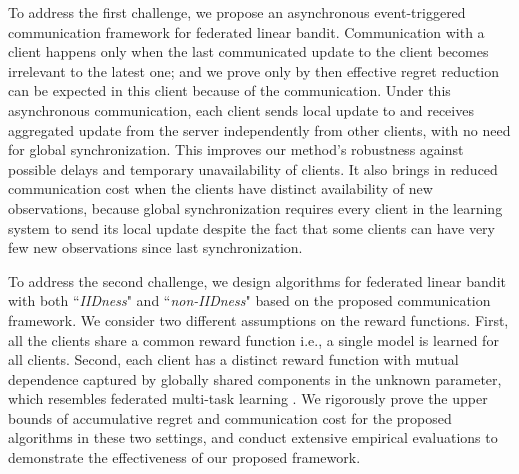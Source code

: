 

To address the first challenge, we propose an asynchronous event-triggered communication framework for federated linear bandit. 
Communication with a client happens only when the last communicated update to the client becomes irrelevant to the latest one; and we prove only by then effective regret reduction can be expected in this client because of the communication. 
Under this asynchronous communication, each client sends local update to and receives aggregated update from the server independently from other clients, with no need for global synchronization. This improves our method's robustness against possible delays and temporary unavailability of clients. It also brings in reduced communication cost when the clients have distinct availability of new observations, because global synchronization requires every client in the learning system to send its local update despite the fact that some clients can have very few new observations since last synchronization.

To address the second challenge, we design algorithms for federated linear bandit with both ``\emph{IIDness}" and ``\emph{non-IIDness}" based on the proposed communication framework. We consider two different assumptions on the reward functions. First, all the clients share a common reward function i.e., a single model is learned for all clients. Second, each client has a distinct reward function with mutual dependence captured by globally shared components in the unknown parameter, which resembles 
federated multi-task learning \citep{smith2017federated}.
We rigorously prove the upper bounds of accumulative regret and communication cost for the proposed algorithms in these two settings, and conduct extensive empirical evaluations to demonstrate the effectiveness of our proposed framework.
